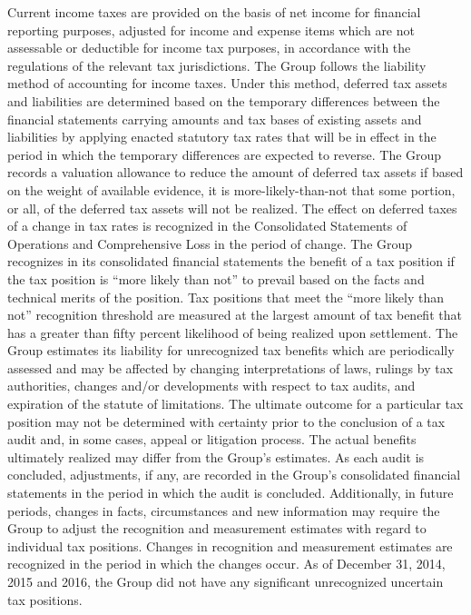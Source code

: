 Current income taxes are provided on the basis of net income for financial reporting purposes, adjusted for income and expense items which are not assessable or deductible for income tax purposes, in accordance with the regulations of the relevant tax jurisdictions. The Group follows the liability method of accounting for income taxes. Under this method, deferred tax assets and liabilities are determined based on the temporary differences between the financial statements carrying amounts and tax bases of existing assets and liabilities by applying enacted statutory tax rates that will be in effect in the period in which the temporary differences are expected to reverse. The Group records a valuation allowance to reduce the amount of deferred tax assets if based on the weight of available evidence, it is more-likely-than-not that some portion, or all, of the deferred tax assets will not be realized. The effect on deferred taxes of a change in tax rates is recognized in the Consolidated Statements of Operations and Comprehensive Loss in the period of change. The Group recognizes in its consolidated financial statements the benefit of a tax position if the tax position is “more likely than not” to prevail based
on the facts and technical merits of the position. Tax positions that meet the “more likely than not” recognition threshold are measured at the largest amount
of tax benefit that has a greater than fifty percent likelihood of being realized upon settlement. The Group estimates its liability for unrecognized tax benefits
which are periodically assessed and may be affected by changing interpretations of laws, rulings by tax authorities, changes and/or developments with
respect to tax audits, and expiration of the statute of limitations. The ultimate outcome for a particular tax position may not be determined with certainty
prior to the conclusion of a tax audit and, in some cases, appeal or litigation process. The actual benefits ultimately realized may differ from the Group’s
estimates. As each audit is concluded, adjustments, if any, are recorded in the Group’s consolidated financial statements in the period in which the audit is
concluded. Additionally, in future periods, changes in facts, circumstances and new information may require the Group to adjust the recognition and
measurement estimates with regard to individual tax positions. Changes in recognition and measurement estimates are recognized in the period in which the
changes occur. As of December 31, 2014, 2015 and 2016, the Group did not have any significant unrecognized uncertain tax positions.

